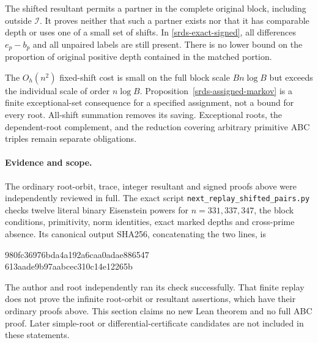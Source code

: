 The shifted resultant permits a partner in the complete original
block, including outside \(\mathcal I\). It proves neither that
such a partner exists nor that it has comparable depth or uses
one of a small set of shifts. In
\eqref{srds-exact-signed}, all differences \(e_p-b_p\) and
all unpaired labels are still present. There is no lower bound
on the proportion of original positive depth contained in the
matched portion.

The \(O_h(n^2)\) fixed-shift cost is small on the full block
scale \(Bn\log B\) but exceeds the individual scale of order
\(n\log B\). Proposition~\ref{srds-assigned-markov} is a finite
exceptional-set consequence for a specified assignment, not
a bound for every root. All-shift summation removes its saving.
Exceptional roots, the dependent-root complement, and the
reduction covering arbitrary primitive ABC triples remain
separate obligations.

\paragraph{Evidence and scope.}
The ordinary root-orbit, trace, integer resultant and signed
proofs above were independently reviewed in full. The exact
script \texttt{next\_replay\_shifted\_\allowbreak pairs.py}
checks twelve literal binary Eisenstein powers for
\(n=331,337,347\), the block conditions, primitivity, norm
identities, exact marked depths and cross-prime absence.
Its canonical output SHA256, concatenating the two lines, is
\begin{center}
\small\ttfamily
980fc36976bda4a192a6caa0adae886547\\
613aade9b97aabcec310c14e12265b
\end{center}
The author and root independently ran its check successfully.
That finite replay does not prove the infinite root-orbit or
resultant assertions, which have their ordinary proofs above.
This section claims no new Lean theorem and no full ABC proof.
Later simple-root or differential-certificate candidates are
not included in these statements.
